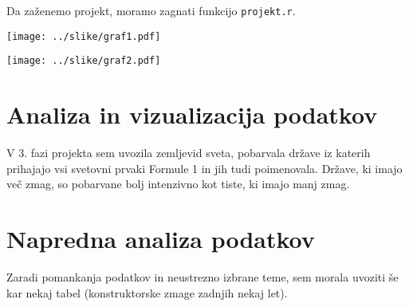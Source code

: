 \documentclass[11pt,a4paper]{article}
\begin{document}
Da zaženemo projekt, moramo zagnati funkcijo \verb|projekt.r|.

\texttt{[image: ../slike/graf1.pdf]}

\texttt{[image: ../slike/graf2.pdf]}

\section{Analiza in vizualizacija podatkov}

V 3. fazi projekta sem uvozila zemljevid sveta, pobarvala države iz katerih prihajajo vsi svetovni prvaki Formule 1 in jih tudi poimenovala. Države, ki imajo več zmag, so pobarvane bolj intenzivno kot tiste, ki imajo manj zmag. 



\section{Napredna analiza podatkov}

Zaradi pomankanja podatkov in neustrezno izbrane teme, sem morala uvoziti še kar nekaj tabel (konstruktorske zmage zadnjih nekaj let). 
\end{document}
